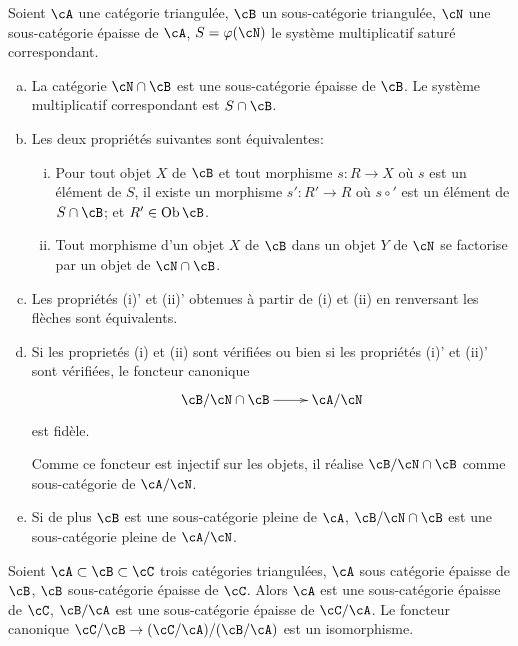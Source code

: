 \begin{theorem}\label{VIII:2-4-2}
Soient $\cA$ une catégorie triangulée, $\cB$ un sous-catégorie 
triangulée, $\cN$ une sous-catégorie épaisse de $\cA$, $S=\varphi(\cN)$ 
le système multiplicatif saturé correspondant. 
\begin{enumerate}[(a)]
  \item La catégorie $\cN\cap\cB$ est une sous-catégorie épaisse de 
    $\cB$. Le système multiplicatif correspondant est $S\cap \cB$. 
  \item Les deux propriétés suivantes sont équivalentes: 
    \begin{enumerate}[(i)]
      \item Pour tout objet $X$ de $\cB$ et tout morphisme $s:R\to X$ où $s$ 
        est un élément de $S$, il existe un morphisme $s':R'\to R$ où 
        $s\circ'$ est un élément de $S\cap \cB$; et 
        $R'\in\operatorname{Ob}\cB$. 
      \item Tout morphisme d'un objet $X$ de $\cB$ dans un objet $Y$ de $\cN$ 
        se factorise par un objet de $\cN\cap \cB$. 
    \end{enumerate}
  \item Les propriétés (i)' et (ii)' obtenues à partir de (i) et (ii) en 
    renversant les flèches sont équivalents. 
  \item Si les proprietés (i) et (ii) sont vérifiées ou bien si les 
    propriétés (i)' et (ii)' sont vérifiées, le foncteur canonique 
    \[\xymatrix{
      \cB/\cN\cap \cB \ar[r] & \cA/\cN
    }\]
    est fidèle. 
    
    Comme ce foncteur est injectif sur les objets, il réalise 
    $\cB/\cN\cap\cB$ comme sous-catégorie de $\cA/\cN$. 
  \item Si de plus $\cB$ est une sous-catégorie pleine de $\cA$, 
    $\cB/\cN\cap \cB$ est une sous-catégorie pleine de $\cA/\cN$. 
\end{enumerate}
\end{theorem}





\begin{corollary}\label{VIII:2-4-3}
Soient $\cA\subset \cB\subset \cC$ trois catégories triangulées, $\cA$ sous 
catégorie épaisse de $\cB$, $\cB$ sous-catégorie épaisse de $\cC$. 
Alors $\cA$ est une sous-catégorie épaisse de $\cC$, $\cB/\cA$ est une 
sous-catégorie épaisse de $\cC/\cA$. Le foncteur canonique 
$\cC/\cB \to (\cC/\cA)/(\cB/\cA)$ est un isomorphisme. 
\end{corollary}










